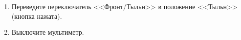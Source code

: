 \begin{enumerate}

\item Переведите переключатель <<Фронт/Тыльн>> в положение <<Тыльн>> (кнопка нажата). 
\item Выключите мультиметр.

\end{enumerate}
